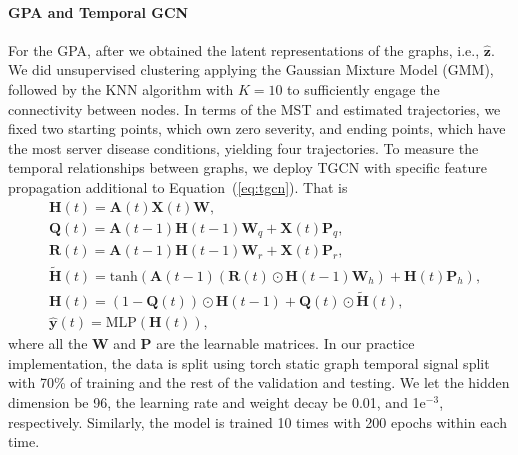 \documentclass{article} %
\begin{document}
\paragraph{GPA and Temporal GCN}
For the GPA, after we obtained the latent representations of the graphs, i.e., $\widehat{\mathbf z}$. We did unsupervised clustering applying the Gaussian Mixture Model (GMM), followed by the KNN algorithm with $K = 10$ to sufficiently engage the connectivity between nodes. In terms of the MST and estimated trajectories, we fixed two starting points, which own zero severity, and ending points, which have the most server disease conditions, yielding four trajectories. To measure the temporal relationships between graphs, we deploy TGCN \citep{zhao2019t} with specific feature propagation additional to Equation~(\ref{eq:tgcn}). That is
\begin{align}
    &\mathbf H(t) = \mathbf A(t) \mathbf X(t) \mathbf W, \\
    &\mathbf Q(t) = \mathbf A(t-1) \mathbf H(t-1) \mathbf W_q + \mathbf X(t)\mathbf P_q, \\
    &\mathbf R(t) = \mathbf A(t-1) \mathbf H(t-1)\mathbf W_r  +  \mathbf X(t)\mathbf P_r, \\
    & \widetilde{\mathbf H}(t) = \mathrm{tanh} \left (\mathbf A(t-1) (\mathbf R(t) \odot \mathbf H(t-1) \mathbf W_h) +  \mathbf H(t) \mathbf P_h \right),\\
    & \mathbf H(t) = (1-\mathbf Q(t)) \odot \mathbf H(t-1) + \mathbf Q(t) \odot \widetilde{\mathbf H}(t),\\   
    & \widehat {\mathbf y}(t) = \mathrm{MLP}({\mathbf H}(t)),
\end{align}
where all the $\mathbf W$ and $\mathbf P$ are the learnable matrices. In our practice implementation, the data is split using torch static graph temporal signal split with 70\% of training and the rest of the validation and testing. We let the hidden dimension be 96, the learning rate and weight decay be 0.01, and 1$\mathrm{e}^{-3}$, respectively. Similarly, the model is trained 10 times with 200 epochs within each time.  
\end{document}
